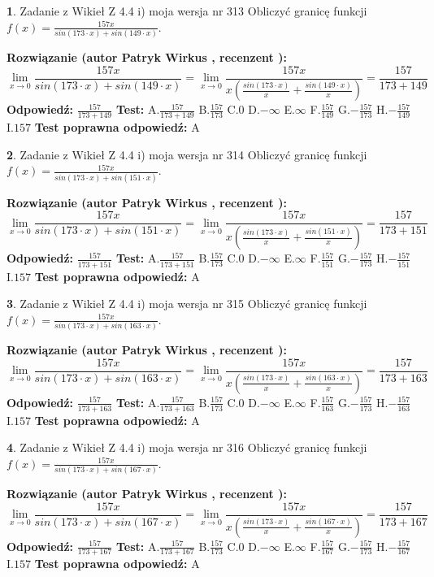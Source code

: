 \documentclass[12pt, a4paper]{article}
\theoremstyle{definition} %
\newtheorem{zad}{}
\newcommand{\zadStart}[1]{\begin{zad}#1\newline}
\newcommand{\zadStop}{\end{zad}}
\newcommand{\rozwStart}[2]{\noindent \textbf{Rozwiązanie (autor #1 , recenzent #2): }\newline}
\newcommand{\rozwStop}{\newline}
\newcommand{\odpStart}{\noindent \textbf{Odpowiedź:}\newline}
\newcommand{\odpStop}{\newline}
\newcommand{\testStart}{\noindent \textbf{Test:}\newline}
\newcommand{\testStop}{\newline}
\newcommand{\kluczStart}{\noindent \textbf{Test poprawna odpowiedź:}\newline}
\newcommand{\kluczStop}{\newline}
\begin{document}
\zadStart{Zadanie z Wikieł Z 4.4 i) moja wersja nr 313}
Obliczyć granicę funkcji $f(x)=\frac{157x}{sin(173\cdot x) +sin(149\cdot x)}$.
\zadStop
\rozwStart{Patryk Wirkus}{}
$$\lim\limits_{x\to 0}\frac{157x}{sin(173\cdot x) +sin(149\cdot x)}=\lim\limits_{x\to 0}\frac{157x}{x(\frac{sin(173\cdot x)}{x}+\frac{sin(149\cdot x)}{x})}=\frac{157}{173+149}$$
\rozwStop
\odpStart
$\frac{157}{173+149}$
\odpStop
\testStart
A.$\frac{157}{173+149}$
B.$\frac{157}{173}$
C.$0$
D.$-\infty$
E.$\infty$
F.$\frac{157}{149}$
G.$-\frac{157}{173}$
H.$-\frac{157}{149}$
I.$157$
\testStop
\kluczStart
A
\kluczStop



\zadStart{Zadanie z Wikieł Z 4.4 i) moja wersja nr 314}
Obliczyć granicę funkcji $f(x)=\frac{157x}{sin(173\cdot x) +sin(151\cdot x)}$.
\zadStop
\rozwStart{Patryk Wirkus}{}
$$\lim\limits_{x\to 0}\frac{157x}{sin(173\cdot x) +sin(151\cdot x)}=\lim\limits_{x\to 0}\frac{157x}{x(\frac{sin(173\cdot x)}{x}+\frac{sin(151\cdot x)}{x})}=\frac{157}{173+151}$$
\rozwStop
\odpStart
$\frac{157}{173+151}$
\odpStop
\testStart
A.$\frac{157}{173+151}$
B.$\frac{157}{173}$
C.$0$
D.$-\infty$
E.$\infty$
F.$\frac{157}{151}$
G.$-\frac{157}{173}$
H.$-\frac{157}{151}$
I.$157$
\testStop
\kluczStart
A
\kluczStop



\zadStart{Zadanie z Wikieł Z 4.4 i) moja wersja nr 315}
Obliczyć granicę funkcji $f(x)=\frac{157x}{sin(173\cdot x) +sin(163\cdot x)}$.
\zadStop
\rozwStart{Patryk Wirkus}{}
$$\lim\limits_{x\to 0}\frac{157x}{sin(173\cdot x) +sin(163\cdot x)}=\lim\limits_{x\to 0}\frac{157x}{x(\frac{sin(173\cdot x)}{x}+\frac{sin(163\cdot x)}{x})}=\frac{157}{173+163}$$
\rozwStop
\odpStart
$\frac{157}{173+163}$
\odpStop
\testStart
A.$\frac{157}{173+163}$
B.$\frac{157}{173}$
C.$0$
D.$-\infty$
E.$\infty$
F.$\frac{157}{163}$
G.$-\frac{157}{173}$
H.$-\frac{157}{163}$
I.$157$
\testStop
\kluczStart
A
\kluczStop



\zadStart{Zadanie z Wikieł Z 4.4 i) moja wersja nr 316}
Obliczyć granicę funkcji $f(x)=\frac{157x}{sin(173\cdot x) +sin(167\cdot x)}$.
\zadStop
\rozwStart{Patryk Wirkus}{}
$$\lim\limits_{x\to 0}\frac{157x}{sin(173\cdot x) +sin(167\cdot x)}=\lim\limits_{x\to 0}\frac{157x}{x(\frac{sin(173\cdot x)}{x}+\frac{sin(167\cdot x)}{x})}=\frac{157}{173+167}$$
\rozwStop
\odpStart
$\frac{157}{173+167}$
\odpStop
\testStart
A.$\frac{157}{173+167}$
B.$\frac{157}{173}$
C.$0$
D.$-\infty$
E.$\infty$
F.$\frac{157}{167}$
G.$-\frac{157}{173}$
H.$-\frac{157}{167}$
I.$157$
\testStop
\kluczStart
A
\kluczStop
\end{document}
